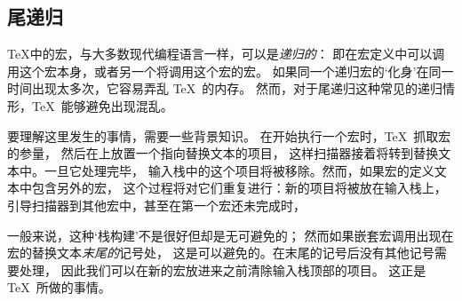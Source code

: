 \documentclass[letterpaper]{book}
\begin{document}
\subsection{尾递归}

\TeX 中的宏，与大多数现代编程语言一样，可以是\emph{递归的}：
即在宏定义中可以调用这个宏本身，或者另一个将调用这个宏的宏。
如果同一个递归宏的`化身'在同一时间出现太多次，它容易弄乱 \TeX\ 的内存。
然而，对于尾递归这种常见的递归情形，\TeX\ 能够避免出现混乱。

要理解这里发生的事情，需要一些背景知识。
在开始执行一个宏时，\TeX\ 抓取宏的参量，
然后在上放置一个指向替换文本的项目，
这样扫描器接着将转到替换文本中。一旦它处理完毕，
输入栈中的这个项目将被移除。然而，如果宏的定义文本中包含另外的宏，
这个过程将对它们重复进行：新的项目将被放在输入栈上，
引导扫描器到其他宏中，甚至在第一个宏还未完成时，

一般来说，这种`栈构建'不是很好但却是无可避免的；
然而如果嵌套宏调用出现在宏的替换文本{\em 末尾的}记号处，
这是可以避免的。在末尾的记号后没有其他记号需要处理，
因此我们可以在新的宏放进来之前清除输入栈顶部的项目。
这正是 \TeX\ 所做的事情。
\end{document}
